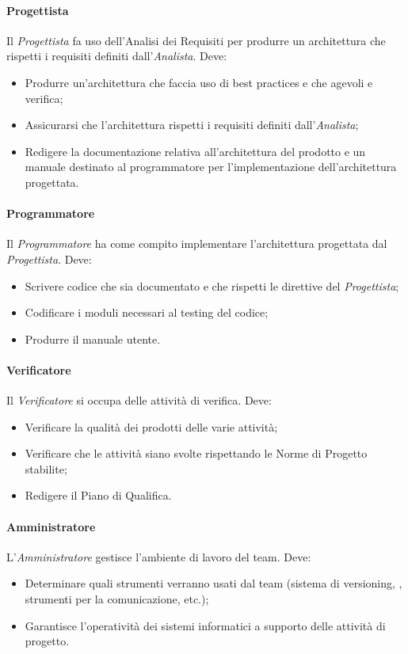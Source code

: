 \paragraph{Progettista} \Spazio
Il \emph{Progettista} fa uso dell'Analisi dei Requisiti per produrre un architettura che rispetti i requisiti definiti dall'\emph{Analista}. Deve:
\begin{itemize}
\item Produrre un'architettura che faccia uso di best practices e che agevoli  e verifica;
\item Assicurarsi che l'architettura rispetti i requisiti definiti dall'\emph{Analista};
\item Redigere la documentazione relativa all'architettura del prodotto e un manuale destinato al programmatore per l'implementazione dell'architettura progettata.
\end{itemize}

\paragraph{Programmatore} \Spazio
Il \emph{Programmatore} ha come compito implementare l'architettura progettata dal \emph{Progettista}. Deve:
\begin{itemize}
\item Scrivere codice che sia documentato e che rispetti le direttive del \emph{Progettista};
\item Codificare i moduli necessari al testing del codice;
\item Produrre il manuale utente.
\end{itemize}

\paragraph{Verificatore} \Spazio
Il \emph{Verificatore} si occupa delle attività di verifica. Deve:
\begin{itemize}
\item Verificare la qualità dei prodotti delle varie attività;
\item Verificare che le attività siano svolte rispettando le Norme di Progetto stabilite;
\item Redigere il Piano di Qualifica.
\end{itemize}

\paragraph{Amministratore} \Spazio
L'\emph{Amministratore} gestisce l'ambiente di lavoro del team. Deve:
\begin{itemize}
\item Determinare quali strumenti verranno usati dal team (sistema di versioning, , strumenti per la comunicazione, etc.);
\item Garantisce l'operatività dei sistemi informatici a supporto delle attività di progetto.
\end{itemize}

